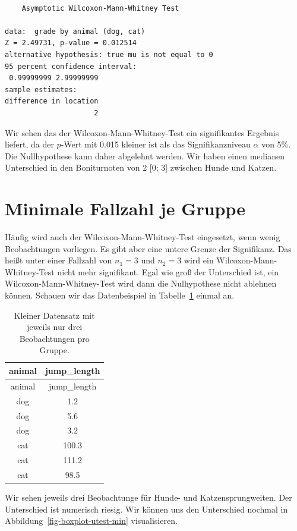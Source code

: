 \documentclass[
  letterpaper,
  DIV=11,
  oneside]{scrreport}
\begin{document}
\begin{verbatim}

    Asymptotic Wilcoxon-Mann-Whitney Test

data:  grade by animal (dog, cat)
Z = 2.49731, p-value = 0.012514
alternative hypothesis: true mu is not equal to 0
95 percent confidence interval:
 0.99999999 2.99999999
sample estimates:
difference in location 
                     2 
\end{verbatim}

Wir sehen das der Wilcoxon-Mann-Whitney-Test ein signifikantes Ergebnis
liefert, da der \(p\)-Wert mit 0.015 kleiner ist als das
Signifikanzniveau \(\alpha\) von 5\%. Die Nullhypothese kann daher
abgelehnt werden. Wir haben einen medianen Unterschied in den
Boniturnoten von 2 {[}0; 3{]} zwischen Hunde und Katzen.

\hypertarget{minimale-fallzahl-je-gruppe}{%
\section{Minimale Fallzahl je
Gruppe}\label{minimale-fallzahl-je-gruppe}}

Häufig wird auch der Wilcoxon-Mann-Whitney-Test eingesetzt, wenn wenig
Beobachtungen vorliegen. Es gibt aber eine untere Grenze der
Signifikanz. Das heißt unter einer Fallzahl von \(n_1 = 3\) und
\(n_2 = 3\) wird ein Wilcoxon-Mann-Whitney-Test nicht mehr signifikant.
Egal wie groß der Unterschied ist, ein Wilcoxon-Mann-Whitney-Test wird
dann die Nulhypothese nicht ablehnen können. Schauen wir das
Datenbeispiel in Tabelle~\ref{tbl-data-utest-2} einmal an.

\hypertarget{tbl-data-utest-2}{}
\begin{longtable}[]{@{}cc@{}}
\caption{\label{tbl-data-utest-2}Kleiner Datensatz mit jeweils nur drei
Beobachtungen pro Gruppe.}\tabularnewline
\toprule()
animal & jump\_length \\
\midrule()
\endfirsthead
\toprule()
animal & jump\_length \\
\midrule()
\endhead
dog & 1.2 \\
dog & 5.6 \\
dog & 3.2 \\
cat & 100.3 \\
cat & 111.2 \\
cat & 98.5 \\
\bottomrule()
\end{longtable}

Wir sehen jeweils drei Beobachtunge für Hunde- und Katzensprungweiten.
Der Unterschied ist numerisch riesig. Wir können uns den Unterschied
nochmal in Abbildung~\ref{fig-boxplot-utest-min} visualisieren.
\end{document}
